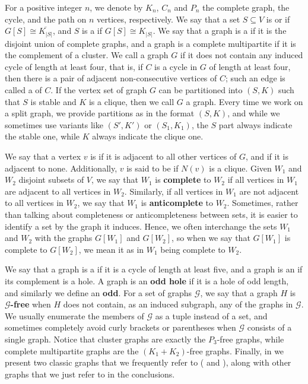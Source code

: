 For a positive integer $n$, we denote by $K_n$, $C_n$ and $P_n$ the complete
graph, the cycle, and the path on $n$ vertices, respectively. We say that a set
$S\subseteq V$ is  or  if
$G[S] \cong \overline{K_{|S|}}$, and $S$ is a  if $G[S]
\cong K_{|S|}$. We say that a graph is a 
if it is the disjoint union of complete graphs, and a graph is a complete
multipartite if it is the complement of a cluster. We call a graph $G$
 if it does not contain any induced cycle
of length at least four, that is, if $C$ is a cycle in $G$ of length at least
four, then there is a pair of adjacent non-consecutive vertices of $C$; such an
edge is called a  of $C$. If the vertex set of graph $G$ can be
partitioned into $(S,K)$ such that $S$ is stable and $K$ is a clique, then we
call $G$ a  graph. Every time we work on a
split graph, we provide partitions as in the format $(S,K)$, and while we
sometimes use variants like $(S',K')$ or $(S_1, K_1)$,  the $S$ part always
indicate the stable one, while $K$ always indicate the clique one.

We say that a vertex $v$ is  if it is adjacent to
all other vertices of $G$, and  if it is adjacent to
none. Additionally, $v$ is said to be  if $N(v)$
is a clique. Given $W_1$ and $W_2$ disjoint subsets of $V$, we say that $W_1$ is
\textbf{complete} to $W_2$ if all vertices in $W_1$ are
adjacent to all vertices in $W_2$. Similarly, if all vertices in $W_1$ are not
adjacent to all vertices in $W_2$, we say that $W_1$ is
\textbf{anticomplete} to $W_2$. Sometimes, rather than
talking about completeness or anticompleteness between sets, it is easier to
identify a set by the graph it induces. Hence, we often interchange the sets
$W_1$ and $W_2$ with the graphs $G[W_1]$ and $G[W_2]$, so when we say that
$G[W_1]$ is complete to $G[W_2]$, we mean it as in $W_1$ being complete to
$W_2$.

We say that a graph is a  if it is a cycle of length at least five,
and a graph is an  if its complement is a hole. A graph is an
\textbf{odd hole} if it is a hole of odd length, and similarly
we define an \textbf{odd}. For a set of graphs
$\mathcal{G}$, we say that a graph $H$ is
\textbf{$\mathcal{G}$-free} when $H$ does not
contain, as an induced subgraph, any of the graphs in $\mathcal{G}$. We usually
enumerate the members of $\mathcal{G}$ as a tuple instead of a set, and
sometimes completely avoid curly brackets or parentheses when $\mathcal{G}$
consists of a single graph. Notice that cluster graphs are exactly the
$P_3$-free graphs, while complete multipartite graphs are the $(K_1 + K_2)$-free
graphs. Finally, in  we present two classic graphs that we
frequently refer to ( and ),
along with other graphs that we just refer to in the conclusions.

